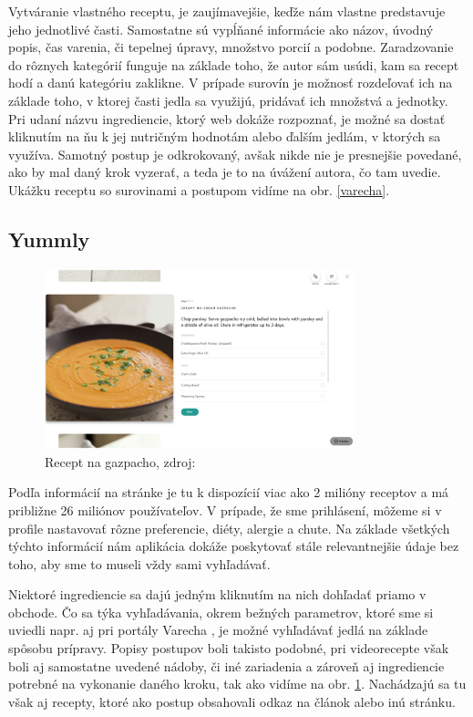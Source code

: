 Vytváranie vlastného receptu, je zaujímavejšie, keďže nám vlastne predstavuje jeho
jednotlivé časti. Samostatne sú vypĺňané informácie ako názov, úvodný popis, čas varenia, či tepelnej úpravy, množstvo porcií a podobne. Zaradzovanie do rôznych kategórií
funguje na základe toho, že autor sám usúdi, kam sa recept hodí a danú kategóriu
zaklikne. V prípade surovín je možnosť rozdeľovať ich na základe toho, v ktorej časti
jedla sa využijú, pridávať ich množstvá a jednotky. Pri udaní názvu ingrediencie, ktorý
web dokáže rozpoznať, je možné sa dostať kliknutím na ňu k jej nutričným hodnotám
alebo ďalším jedlám, v ktorých sa využíva. Samotný postup je odkrokovaný, avšak nikde nie je presnejšie povedané, ako by mal daný krok vyzerať, a teda je to na úvážení
autora, čo tam uvedie. Ukážku receptu so surovinami a postupom vidíme na obr. \ref{varecha}.

\subsection{Yummly}

\begin{figure}[h]
\centering
\includegraphics[width=0.8\textwidth]{images/yummly}
\caption{Recept na gazpacho, zdroj: \cite{yummly}}
\label{yummly}
\end{figure}

Podľa informácií na stránke \cite{yummly} je tu k dispozícií viac ako 2 milióny receptov a má
približne 26 miliónov používateľov. V prípade, že sme prihlásení, môžeme si v profile
nastavovať rôzne preferencie, diéty, alergie a chute. Na základe všetkých týchto informácií nám aplikácia dokáže poskytovať stále relevantnejšie údaje bez toho, aby sme to
museli vždy sami vyhľadávať.

Niektoré ingrediencie sa dajú jedným kliknutím na nich dohľadať priamo v obchode.
Čo sa týka vyhľadávania, okrem bežných parametrov, ktoré sme si uviedli napr. aj pri
portály Varecha \cite{varecha}, je možné vyhľadávať jedlá na základe spôsobu prípravy. Popisy
postupov boli takisto podobné, pri videorecepte však boli aj samostatne uvedené nádoby, či iné zariadenia a zároveň aj ingrediencie potrebné na vykonanie daného kroku,
tak ako vidíme na obr. \ref{yummly}. Nachádzajú sa tu však aj recepty, ktoré ako postup
obsahovali odkaz na článok alebo inú stránku.



